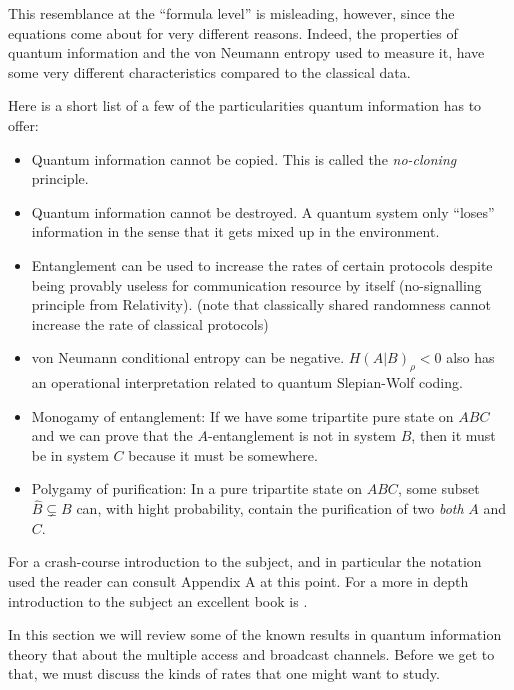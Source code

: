\documentclass[aps,11pt,twoside,letterpaper]{article}
\begin{document}
	This resemblance at the ``formula level'' is misleading, however, since the equations
	come about for very different reasons.
	Indeed, the properties of quantum information and the von Neumann entropy used
	to measure it, have some very different characteristics compared to the classical data.
	
	Here is a short list of a few of the particularities quantum information has to offer:
	
	\begin{itemize}
		\item 	Quantum information cannot be copied. This is called the \emph{no-cloning} principle.
		\item 	Quantum information cannot be destroyed. A quantum system only ``loses'' 
				information in the sense that it gets mixed up in the environment.
		\item 	Entanglement can be used to increase the rates of certain protocols despite being
				provably useless for communication resource by itself (no-signalling principle from Relativity).
				(note that classically shared randomness cannot increase the rate of classical protocols)
		\item 	von Neumann conditional entropy can be negative. 
				$H(A|B)_\rho < 0$ also has an operational interpretation related to quantum Slepian-Wolf coding.
		\item 	Monogamy of entanglement:  If we have some tripartite pure state on $ABC$ and we
				can prove that the $A$-entanglement is not in system $B$, then it must be in system $C$ 
				because it must be somewhere.
		\item		Polygamy of purification: In a pure tripartite state on $ABC$, some subset $\hat{B} \subsetneq B $ can,
				with hight probability, contain the purification of two \emph{both} $A$ and $C$.
	\end{itemize}	

	For a crash-course introduction to the subject, and in particular the notation
	used the reader can consult Appendix A at this point.
	For a more in depth introduction to the subject an excellent book is \cite{NC04}.


	In this section we will review some of the known results in quantum information theory
	that about the multiple access and broadcast channels. 
	Before we get to that, we must discuss the kinds of rates that one might want to study.
\end{document}
